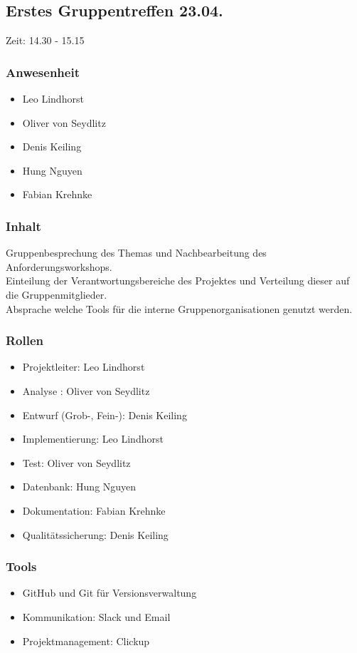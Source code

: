 \subsection{Erstes Gruppentreffen 23.04.}

Zeit: 14.30 - 15.15 

\subsubsection{Anwesenheit}
\begin{itemize}
	\item Leo Lindhorst
	\item Oliver von Seydlitz
	\item Denis Keiling
	\item Hung Nguyen
	\item Fabian Krehnke
\end{itemize}

\subsubsection{Inhalt}
Gruppenbesprechung des Themas und Nachbearbeitung des Anforderungsworkshops. 
\\Einteilung der Verantwortungsbereiche des Projektes und 
Verteilung dieser auf die Gruppenmitglieder.
\\Absprache welche Tools für die interne Gruppenorganisationen genutzt werden. 

\subsubsection{Rollen}
\begin{itemize}
	\item Projektleiter: Leo Lindhorst
	\item Analyse : Oliver von Seydlitz
	\item Entwurf (Grob-, Fein-): Denis Keiling
	\item Implementierung: Leo Lindhorst
	\item Test: Oliver von Seydlitz
	\item Datenbank: Hung Nguyen
	\item Dokumentation: Fabian Krehnke 
	\item Qualitätssicherung: Denis Keiling 
\end{itemize}

\subsubsection{Tools}
\begin{itemize}
	\item GitHub und Git für Versionsverwaltung 
	\item Kommunikation: Slack und Email
	\item Projektmanagement: Clickup
\end{itemize}



